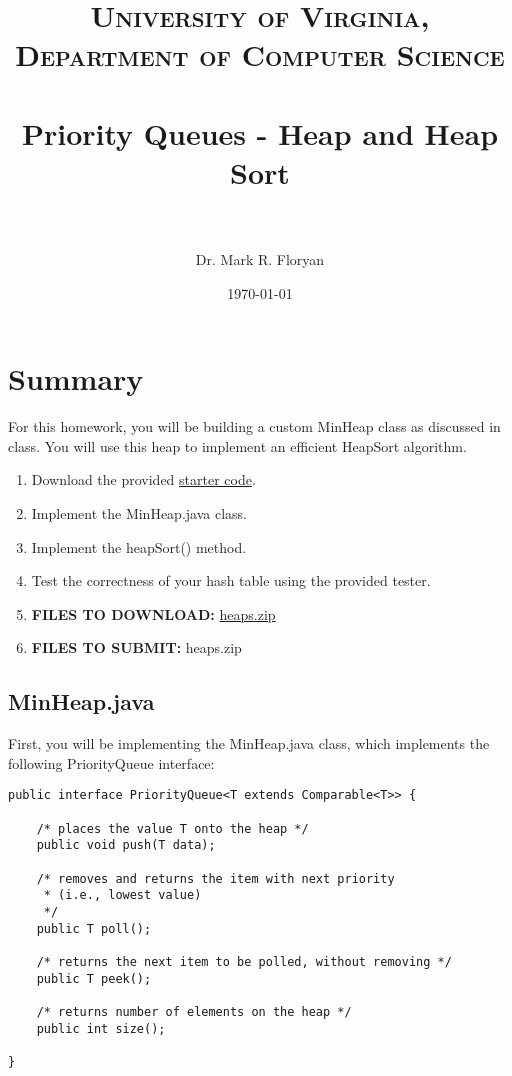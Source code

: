 \documentclass[paper=a4, fontsize=11pt, parskip=full]{scrartcl} %
\title{
\normalfont \normalsize
\textsc{University of Virginia, Department of Computer Science} \\ [25pt] %
\horrule{0.5pt} \\[0.4cm] %
\huge Priority Queues - Heap and Heap Sort \\ %
\horrule{2pt} \\[0.5cm] %
}
\author{Dr. Mark R. Floryan} %
\date{\normalsize\today} %
\numberwithin{equation}{section} %
\numberwithin{figure}{section} %
\numberwithin{table}{section} %
\begin{document}
\maketitle %


\section{Summary}

For this homework, you will be building a custom MinHeap class as discussed in class. You will use this heap to implement an efficient HeapSort algorithm. 

\begin{enumerate}
	\item Download the provided \href{https://markfloryan.github.io/dsa1/homeworks/PriorityQueues/code/heaps.zip}{starter code}.
	\item Implement the MinHeap.java class.
	\item Implement the heapSort() method.
	\item Test the correctness of your hash table using the provided tester.
	\item \textbf{FILES TO DOWNLOAD:} \href{https://markfloryan.github.io/dsa1/homeworks/PriorityQueues/code/heaps.zip}{heaps.zip}
	\item \textbf{FILES TO SUBMIT:} heaps.zip
\end{enumerate}


\subsection{MinHeap.java}

First, you will be implementing the MinHeap.java class, which implements the following PriorityQueue interface:

\begin{lstlisting}
public interface PriorityQueue<T extends Comparable<T>> {
	
	/* places the value T onto the heap */
	public void push(T data);

	/* removes and returns the item with next priority
     * (i.e., lowest value)
	 */
	public T poll();

	/* returns the next item to be polled, without removing */
	public T peek();

	/* returns number of elements on the heap */
	public int size();
	
}

\end{lstlisting}
\end{document}

